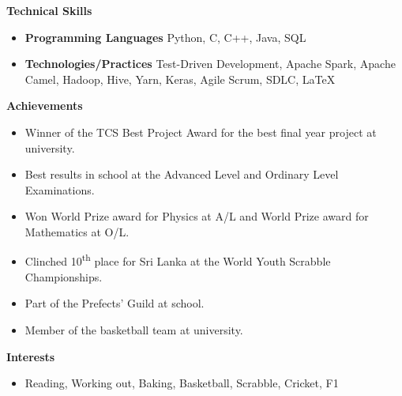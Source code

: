 \documentclass[letterpaper,12pt]{article}[leftmargin=*]
\def \entryspacing {-0pt}
\renewcommand{\section}[2]{\vspace{5pt}
  \colorbox{secondary}{\color{white}\raggedbottom\normalsize\textbf{{#1}{\hspace{7pt}#2}}}
}
\newcommand{\resumeEntryStart}{\begin{itemize}[leftmargin=2.5mm]}
\newcommand{\resumeEntryEnd}{\end{itemize}\vspace{\entryspacing}}
\newcommand{\resumeItemListStart}{\begin{itemize}[leftmargin=4.5mm]}
\newcommand{\resumeItemListEnd}{\end{itemize}}
\newcommand{\resumeItem}[1]{
  \item\small{
    {#1 \vspace{-2pt}}
  }
}
\newcommand{\resumeEntryS}[2]{
  \item[]\small{
    \textbf{\color{primary}#1 }{ #2 \vspace{-6pt}}
  }
}
\begin{document}
\section{\faStar}{Technical Skills}
 \resumeEntryStart
  \resumeEntryS{Programming Languages} {Python, C, C++, Java, SQL}
  \resumeEntryS{Technologies/Practices} {Test-Driven Development, Apache Spark, Apache Camel, Hadoop, Hive, Yarn, Keras, Agile Scrum, SDLC, \LaTeX}
 \resumeEntryEnd
 
\section{\faTrophy}{Achievements}
  \resumeEntryStart
      \resumeItem {Winner of the TCS Best Project Award for the best final year project at university.}
      \resumeItem {Best results in school at the Advanced Level and Ordinary Level Examinations.}
      \resumeItem {Won World Prize award for Physics at A/L and World Prize award for Mathematics at O/L.}
      \resumeItem {Clinched 10\textsuperscript{th} place for Sri Lanka at the World Youth Scrabble Championships.}
      \resumeItem {Part of the Prefects' Guild at school.}
      \resumeItem {Member of the basketball team at university.}
 \resumeEntryEnd

\section{\faHeart}{Interests}
  \resumeEntryStart
      \resumeEntryS {}{Reading, Working out, Baking, Basketball, Scrabble, Cricket, F1}
   \resumeEntryEnd
\end{document}
